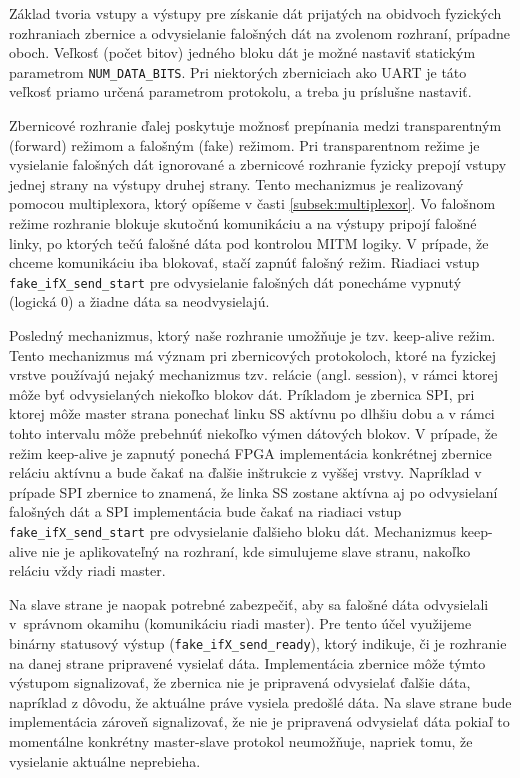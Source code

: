 Základ tvoria vstupy a výstupy pre získanie dát prijatých na obidvoch fyzických rozhraniach zbernice a odvysielanie falošných dát na zvolenom rozhraní, prípadne oboch. Veľkosť (počet bitov) jedného bloku dát je možné nastaviť statickým parametrom \texttt{NUM\_DATA\_BITS}. Pri niektorých zberniciach ako UART je táto veľkosť priamo určená parametrom protokolu, a treba ju príslušne nastaviť.

Zbernicové rozhranie ďalej poskytuje možnosť prepínania medzi transparentným (forward) režimom a falošným (fake) režimom. Pri transparentnom režime je vysielanie falošných dát ignorované a zbernicové rozhranie fyzicky prepojí vstupy jednej strany na výstupy druhej strany. Tento mechanizmus je realizovaný pomocou multiplexora, ktorý opíšeme v časti \ref{subsek:multiplexor}. Vo falošnom režime rozhranie blokuje skutočnú komunikáciu a na výstupy pripojí falošné linky, po ktorých tečú falošné dáta pod kontrolou MITM logiky. V prípade, že chceme komunikáciu iba blokovať, stačí zapnúť falošný režim. Riadiaci vstup \texttt{fake\_ifX\_send\_start} pre odvysielanie falošných dát ponecháme vypnutý (logická 0) a žiadne dáta sa neodvysielajú.

Posledný mechanizmus, ktorý naše rozhranie umožňuje je tzv. keep-alive režim. Tento mechanizmus má význam pri zbernicových protokoloch, ktoré na fyzickej vrstve používajú nejaký mechanizmus tzv. relácie (angl. session), v rámci ktorej môže byť odvysielaných niekoľko blokov dát. Príkladom je zbernica SPI, pri ktorej môže master strana ponechať linku SS aktívnu po dlhšiu dobu a v rámci tohto intervalu môže prebehnúť niekoľko výmen dátových blokov. V prípade, že režim keep-alive je zapnutý ponechá FPGA implementácia konkrétnej zbernice reláciu aktívnu a bude čakať na ďalšie inštrukcie z vyššej vrstvy. Napríklad v prípade SPI zbernice to znamená, že linka SS zostane aktívna aj po odvysielaní falošných dát a SPI implementácia bude čakať na riadiaci vstup \texttt{fake\_ifX\_send\_start} pre odvysielanie ďalšieho bloku dát. Mechanizmus keep-alive nie je aplikovateľný na rozhraní, kde simulujeme slave stranu, nakoľko reláciu vždy riadi master.

Na slave strane je naopak potrebné zabezpečiť, aby sa falošné dáta odvysielali v~správnom okamihu (komunikáciu riadi master). Pre tento účel využijeme binárny statusový výstup (\texttt{fake\_ifX\_send\_ready}), ktorý indikuje, či je rozhranie na danej strane pripravené vysielať dáta. Implementácia zbernice môže týmto výstupom signalizovať, že zbernica nie je pripravená odvysielať ďalšie dáta, napríklad z dôvodu, že aktuálne práve vysiela predošlé dáta. Na slave strane bude implementácia zároveň signalizovať, že nie je pripravená odvysielať dáta pokiaľ to momentálne konkrétny master-slave protokol neumožňuje, napriek tomu, že vysielanie aktuálne neprebieha.

